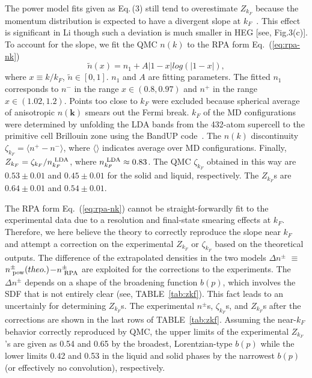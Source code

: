 \documentclass[twocolumn,showpacs,showkeys,fleqn,prl,superscriptaddress]{revtex4}%
\newcommand{\nn}[1]{\textnormal{ #1}}
\begin{document}
\vspace{10mm}

The power model fits given as Eq.\,(3) still tend to overestimate $Z_{k_F}$ because the momentum distribution is expected to have a divergent slope at $k_F$~\cite{gg02}. 
This effect is significant in Li though such a deviation is much smaller in HEG [see, Fig.3(c)]. 
To account for the slope, we fit the QMC $n(k)$ to the RPA form Eq.~(\ref{eq:rpa-nk})
\begin{equation} \label{eq:rpa-nk}
\tilde{n}(x) = n_1 + A\vert 1-x\vert log\left(\vert 1-x\vert\right),
\end{equation}
where $x\equiv k/k_F$, $\tilde{n}\in[0,1]$. $n_1$ and $A$ are fitting parameters. The fitted $n_1$ corresponds to $n^-$ in the range $x\in(0.8, 0.97)$ and $n^+$ in the range $x\in(1.02, 1.2)$. Points too close to $k_F$ were excluded because spherical average of anisotropic $n(\boldsymbol{k})$ smears out the Fermi break. $k_F$ of the MD configurations were determined by unfolding the LDA bands from the 432-atom supercell to the primitive cell Brillouin zone using the BandUP code~\cite{Medeiros2014,Medeiros2015}. The $n(k)$ discontinuity $\zeta_{k_F}= \langle n^+-n^-\rangle$, where $\langle\rangle$ indicates average over MD configurations. Finally, $Z_{k_F} = \zeta_{k_F}/n_{k_F}^{\nn{LDA}}$, where $n_{k_F}^\nn{LDA}\approx0.83$. The QMC $\zeta_{k_F}$ obtained in this way are $0.53\pm0.01$ and $0.45\pm0.01$ for the solid and liquid, respectively. The $Z_{k_F}$s are $0.64\pm0.01$ and $0.54\pm0.01$.


The RPA form Eq.~(\ref{eq:rpa-nk}) cannot be straight-forwardly fit to the experimental data due to a resolution and final-state smearing effects at $k_F$.
Therefore, we here believe the theory to correctly reproduce the slope near $k_F$ and attempt a correction on the experimental $Z_{k_F}$ or $\zeta_{k_F}$ based on the theoretical outputs. 
The difference of the extrapolated densities in the two models $\Delta n^{\pm}$ $\equiv$ $n^{\pm}_{\nn{pow}} (theo.)$$-$$n^{\pm}_{\nn{RPA}}$ are exploited for the corrections to the experiments.
The $\Delta n^{\pm}$ depends on a shape of the broadening function $b(p)$, which involves the SDF that is not entirely clear (see, TABLE~\ref{tab:zkf}). 
This fact leads to an uncertainly for determining $Z_{k_F}$s.
The experimental $n^{\pm}$s, $\zeta_{k_F}$s, and $Z_{k_F}$s after the corrections are shown in the last rows of TABLE~\ref{tab:zkf}.
Assuming the near-${k_F}$ behavior correctly reproduced by QMC, the upper limits of the experimental $Z_{k_F}$’s are given as 0.54 and 0.65 by the broadest, Lorentzian-type $b(p)$ while the lower limits 0.42 and 0.53 in the liquid and solid phases by the narrowest $b(p)$ (or effectively no convolution), respectively.
\end{document}
